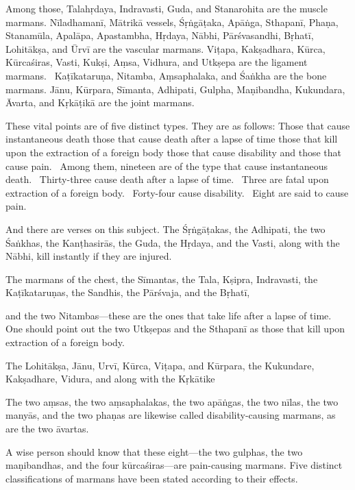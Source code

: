 \begin{translation}
\begin{tt}
\item[7]
Among those, Talahṛdaya, Indravasti, Guda, and Stanarohita are the muscle marmans.
Nīladhamanī, Mātrikā vessels, Śṛṅgāṭaka, Apāṅga, Sthapanī, Phaṇa, Stanamūla, Apalāpa, Apastambha, Hṛdaya, Nābhi, Pārśvasandhi, Bṛhatī, Lohitākṣa, and Ūrvī are the vascular marmans.
Viṭapa, Kakṣadhara, Kūrca, Kūrcaśiras, Vasti, Kukṣi, Aṃsa, Vidhura, and Utkṣepa are the ligament marmans. 
Kaṭīkataruṇa, Nitamba, Aṃsaphalaka, and Śaṅkha are the bone marmans.
Jānu, Kūrpara, Sīmanta, Adhipati, Gulpha, Maṇibandha, Kukundara, Āvarta, and Kṛkāṭikā are the joint marmans.

\item[8]
These vital points are of five distinct types.
They are as follows:
Those that cause instantaneous death
those that cause death after a lapse of time
those that kill upon the extraction of a foreign body
those that cause disability
and those that cause pain. 
Among them, nineteen are of the type that cause instantaneous death. 
Thirty-three cause death after a lapse of time. 
Three are fatal upon extraction of a foreign body. 
Forty-four cause disability. 
Eight are said to cause pain. 


\item[9]
And there are verses on this subject.
The Śṛṅgāṭakas, the Adhipati, the two Śaṅkhas, the Kanṭhasirās, the Guda, the Hṛdaya, and the Vasti, along with the Nābhi, kill instantly if they are injured. 

\item[10]
The marmans of the chest, the Sīmantas, the Tala, Kṣipra, Indravasti, the Kaṭīkataruṇas, the Sandhis, the Pārśvaja, and the Bṛhatī,

\item[11]
and the two Nitambas—these are the ones that take life after a lapse of time. One should point out the two Utkṣepas and the Sthapanī as those that kill upon extraction of a foreign body.

\item[12]
The Lohitākṣa, Jānu, Urvī, Kūrca, Viṭapa, and Kūrpara, the Kukundare, Kakṣadhare, Vidura, and along with the Kṛkātike


\item[13]
The two aṃsas, the two aṃsaphalakas, the two apāṅgas, the two nīlas, the two manyās, and the two phaṇas are likewise called disability-causing marmans, as are the two āvartas.


\item[14]
A wise person should know that these eight—the two gulphas, the two maṇibandhas, and the four kūrcaśiras—are pain-causing marmans.
Five distinct classifications of marmans have been stated according to their effects.



\end{tt}
\end{translation}
